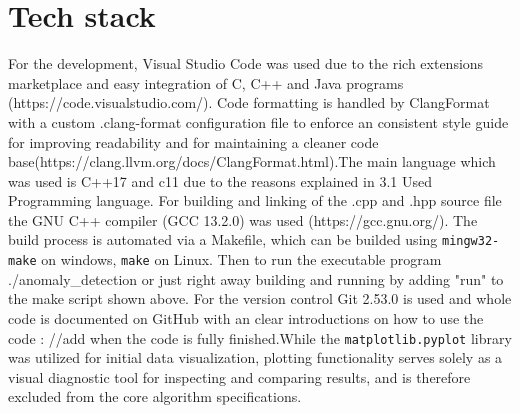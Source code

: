 \section{Tech stack}

For the development, Visual Studio Code was used due to the rich extensions marketplace and easy integration of C, C++ and Java programs (https://code.visualstudio.com/). Code formatting is handled by ClangFormat with a custom .clang-format configuration file to enforce an consistent style guide for improving readability and for maintaining a cleaner code base(https://clang.llvm.org/docs/ClangFormat.html).The main language which was used is C++17 and c11 due to the reasons explained in 3.1 Used Programming language.  For building and linking of the .cpp and .hpp source file the GNU C++ compiler (GCC 13.2.0) was used (https://gcc.gnu.org/). The build process is automated via a Makefile, which can be builded using \texttt{mingw32-make} on windows, \texttt{make} on Linux. Then to run the executable program ./anomaly\_detection or just right away building and running by adding "run" to the make script shown above.
For the version control Git 2.53.0 is used and whole code is documented on GitHub with an clear introductions on how to use the code : //add when the code is fully finished.While the \texttt{matplotlib.pyplot} library was utilized for initial data visualization, plotting functionality serves solely as a visual diagnostic tool for inspecting and comparing results, and is therefore excluded from the core algorithm specifications.